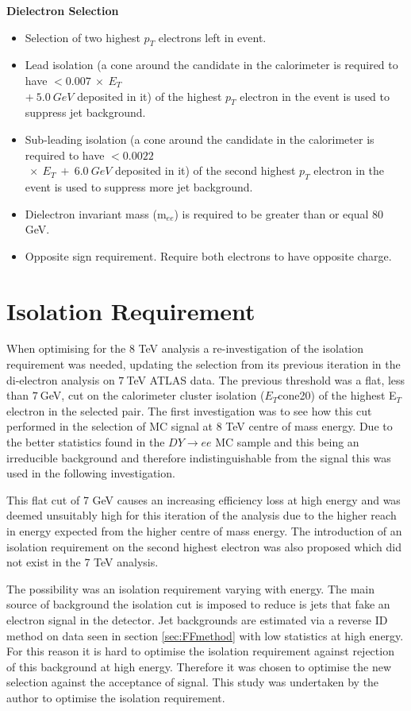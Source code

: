 {\bf Dielectron Selection}
\begin{itemize}
\item Selection of two highest $p_{T}$ electrons left in event.
\item Lead isolation (a cone around the candidate in the calorimeter is required to have  $< 0.007~\times~E_{T}$\\$+~5.0~GeV$ deposited in it) of the highest $p_{T}$ electron in the event is used to suppress jet background. 
\item Sub-leading isolation (a cone around the candidate in the calorimeter is required to have  $< 0.0022$\\$~\times~E_{T}~+~6.0~GeV$ deposited in it) of the second highest $p_{T}$ electron in the event is used to suppress more jet background. 
\item Dielectron invariant mass (m$_{ee}$) is required to be greater than or equal 80 GeV.
\item Opposite sign requirement. Require both electrons to have opposite charge.
\end{itemize}




\section{Isolation Requirement}
   \label{sec:iso}

When optimising for the 8 TeV analysis a re-investigation of the isolation requirement was needed, updating the selection from its previous iteration in the di-electron analysis on $7~$TeV ATLAS data. The previous threshold was a flat, less than $7~$GeV, cut on the calorimeter cluster isolation ($E_{T}$cone20) of the highest E$_{T}$ electron in the selected pair. The first investigation was to see how this cut performed in the selection of MC signal at 8 TeV centre of mass energy. Due to the better statistics found in the $DY{\rightarrow}ee$ MC sample and this being an irreducible background and therefore indistinguishable from the signal this was used in the following investigation.

This flat cut of 7 GeV causes an increasing efficiency loss at high energy and was deemed unsuitably high for this iteration of the analysis due to the higher reach in energy expected from the higher centre of mass energy. The introduction of an isolation requirement on the second highest electron was also proposed which did not exist in the 7 TeV analysis.

The possibility was an isolation requirement varying with energy. The main source of background the isolation cut is imposed to reduce is jets that fake an electron signal in the detector. Jet backgrounds are estimated via a reverse ID method on data seen in section \ref{sec:FFmethod} with low statistics at high energy. For this reason it is hard to optimise the isolation requirement against rejection of this background at high energy. Therefore it was chosen to optimise the new selection against the acceptance of signal. This study was undertaken by the author to optimise the isolation requirement. 

